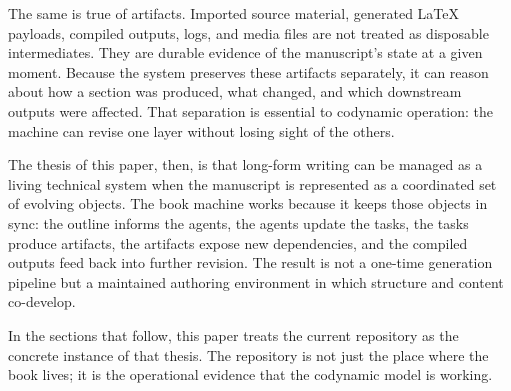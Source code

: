 \documentclass[11pt]{article}
\begin{document}
The same is true of artifacts. Imported source material, generated LaTeX payloads, compiled outputs, logs, and media files are not treated as disposable intermediates. They are durable evidence of the manuscript's state at a given moment. Because the system preserves these artifacts separately, it can reason about how a section was produced, what changed, and which downstream outputs were affected. That separation is essential to codynamic operation: the machine can revise one layer without losing sight of the others.

The thesis of this paper, then, is that long-form writing can be managed as a living technical system when the manuscript is represented as a coordinated set of evolving objects. The book machine works because it keeps those objects in sync: the outline informs the agents, the agents update the tasks, the tasks produce artifacts, the artifacts expose new dependencies, and the compiled outputs feed back into further revision. The result is not a one-time generation pipeline but a maintained authoring environment in which structure and content co-develop.

In the sections that follow, this paper treats the current repository as the concrete instance of that thesis. The repository is not just the place where the book lives; it is the operational evidence that the codynamic model is working.
\end{document}
